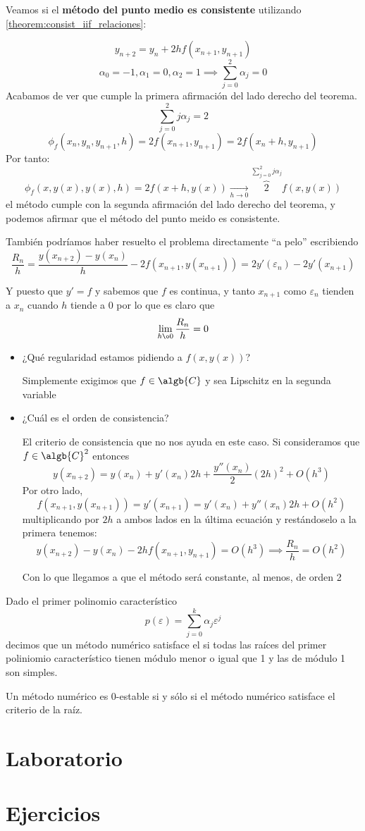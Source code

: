 \documentclass{apuntes}
\begin{document}
\newpage
\begin{example}
	Veamos si el \textbf{método del punto medio es consistente} utilizando \ref{theorem:consist_iif_relaciones}:

	\[y_{n+2} = y_n + 2h f(x_{n+1},y_{n+1})\]
	\[α_0=-1, α_1=0, α_2=1 \implies \sum_{j=0}^2 α_j = 0\]
	Acabamos de ver que cumple la primera afirmación del lado derecho del teorema.
	\[\sum_{j=0}^2 jα_j = 2\]
	\[\phi_f(x_n,y_n,y_{n+1},h) = 2f(x_{n+1},y_{n+1}) = 2f(x_n+h, y_{n+1})\]
	Por tanto:
	\[\phi_f\left( x, y(x), y(x), h \right) = 2f(x+h,y(x)) \underset{h\to0}{\longrightarrow} \overbrace{2}^{\sum_{j=0}^2 jα_j}f(x,y(x))\]
	el método cumple con la segunda afirmación del lado derecho del teorema, y podemos afirmar que el método del punto meido es consistente.

	También podríamos haber resuelto el problema directamente ``a pelo'' escribiendo
	\[\frac{R_n}{h} = \frac{y(x_{n+2})-y(x_n)}{h}-2f(x_{n+1},y(x_{n+1})) = 2y'(ε_n)-2y'(x_{n+1})\]

	Y puesto que $y'=f$ y sabemos que $f$ es continua, y tanto $x_{n+1}$ como $ε_n$ tienden a $x_n$ cuando $h$ tiende a 0 por lo que es claro que
	\[\lim_{h \o 0} \frac{R_n}{h} = 0\]
\end{example}

\begin{obs}
\begin{itemize}
\item ¿Qué regularidad estamos pidiendo a $f(x,y(x))$?

Simplemente exigimos que $f\in \algb{C}$ y sea Lipschitz en la segunda variable

\item ¿Cuál es el orden de consistencia?

El criterio de consistencia que no nos ayuda en este caso. Si consideramos que $f\in \algb{C}^2$ entonces
\[y(x_{n+2})=y(x_n)+y'(x_n)2h + \frac{y''(x_n)}{2}(2h)^2 + O(h^3)\]
Por otro lado,
\[f(x_{n+1},y(x_{n+1}))=y'(x_{n+1}) = y'(x_n) + y''(x_n)2h + O(h^2)\]
multiplicando por $2h$ a ambos lados en la última ecuación y restándoselo a la primera tenemos:
\[y(x_{n+2})-y(x_n)-2hf(x_{n+1},y_{n+1})=O(h^3) \implies \frac{R_n}{h}=O(h^2)\]

Con lo que llegamos a que el método será constante, al menos, de orden 2
\end{itemize}
\end{obs}

Dado el primer polinomio característico
\[p(ε) = \sum_{j=0}^kα_jε^j\]
decimos que un método numérico satisface el  si todas las raíces del primer poliniomio característico tienen módulo menor o igual que 1 y las de módulo 1 son simples.

\begin{theorem}
Un método numérico es 0-estable si y sólo si el método numérico satisface el criterio de la raíz.
\end{theorem}


\chapter{Laboratorio}

\appendix

\chapter{Ejercicios}

\printindex
\end{document}
